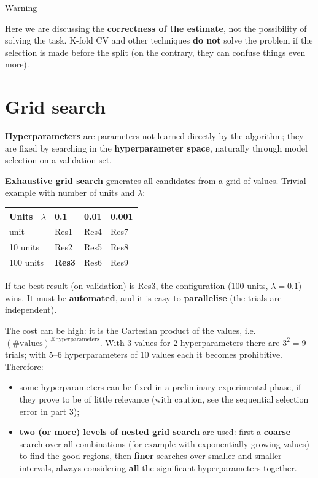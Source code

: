 \begin{boxwarning}{Warning}

Here we are discussing the \textbf{correctness of the estimate}, not
the possibility of solving the task. K-fold CV and other techniques
\textbf{do not} solve the problem if the selection is made before the
split (on the contrary, they can confuse things even more).

\end{boxwarning}

\section{Grid search}\label{grid-search}

\textbf{Hyperparameters} are parameters not learned directly by the
algorithm; they are fixed by searching in the \textbf{hyperparameter
space}, naturally through model selection on a validation set.

\textbf{Exhaustive grid search} generates all candidates from a grid
of values. Trivial example with number of units and \(\lambda\):

{\def\LTcaptype{none} %
\begin{longtable}[]{@{}llll@{}}
\toprule\noalign{}
Units ~\(\lambda\) & 0.1 & 0.01 & 0.001 \\
\midrule\noalign{}
\endhead
\bottomrule\noalign{}
\endlastfoot
1 unit & Res1 & Res4 & Res7 \\
10 units & Res2 & Res5 & Res8 \\
100 units & \textbf{Res3} & Res6 & Res9 \\
\end{longtable}
}

If the best result (on validation) is Res3, the configuration (100
units, \(\lambda = 0.1\)) wins. It must be \textbf{automated}, and it
is easy to \textbf{parallelise} (the trials are independent).

The cost can be high: it is the Cartesian product of the values, i.e.\
\((\#\text{values})^{\#\text{hyperparameters}}\). With 3 values for 2
hyperparameters there are \(3^2 = 9\) trials; with 5--6
hyperparameters of 10 values each it becomes prohibitive. Therefore:

\begin{itemize}
\tightlist
\item
  some hyperparameters can be fixed in a preliminary experimental
  phase, if they prove to be of little relevance (with caution, see the
  sequential selection error in part 3);
\item
  \textbf{two (or more) levels of nested grid search} are used: first
  a \textbf{coarse} search over all combinations (for example with
  exponentially growing values) to find the good regions, then
  \textbf{finer} searches over smaller and smaller intervals, always
  considering \textbf{all} the significant hyperparameters together.
\end{itemize}

